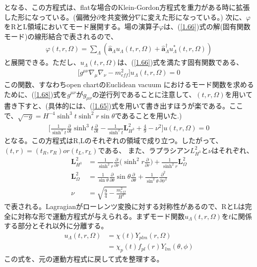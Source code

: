 となる、この方程式は、flatな場合のKlein-Gordon方程式を重力がある時に拡張した形になっている。(偏微分$\partial$を共変微分$\nabla$に変えた形になっている。)
次に、$\varphi$をRとL領域においてモード展開する。場の演算子$\varphi$は、(\ref{1.66})式の解(固有関数モード)の線形結合で表されるので、
\begin{align}
  \varphi(t,r,\Omega)=\sum_{\Lambda}(\hat{\bm{a}}_{\Lambda}u_{\Lambda}(t,r,\Omega)+\hat{\bm{a}}^{\dagger}_{\Lambda}u^{*}_{\Lambda}(t,r,\Omega))
\end{align}
と展開できる。ただし、$u_{\Lambda}(t,r,\Omega)$は、(\ref{1.66})式を満たす固有関数である、
\begin{align}
  \label{1.68}
\biggl[g^{\mu\nu}\nabla_{\mu}\nabla_{\nu}-m_{eff}^2\biggr]u_{\Lambda}(t,r,\Omega)=0
\end{align}
この関数、すなわちopen chartのEuclidean vacuum におけるモード関数を求めるために、(\ref{1.68})式を$g^{\mu\nu}$が$g_{\mu\nu}$の逆行列であることに注意して、$(t,r,\Omega)$を用いて書き下すと、(具体的には、(\ref{1.65})式を用いて書き出すほうが楽である。ここで、$\sqrt{-g}=H^{-4}\sinh^3t\sinh^2r\sin\theta$であることを用いた.)
\begin{align}
  \biggl[\frac{1}{\sinh^3t}\frac{\partial}{\partial t}\sinh^3t\frac{\partial}{\partial t}-\frac{1}{\sinh^2t}\bm{L}^2_{H^3}+\frac{4}{9}-\nu^2\biggr]u(t,r,\Omega)=0
\end{align}
となる。この方程式はR,Lのそれぞれの領域で成り立つ。したがって、$(t,r)=(t_{R},r_{R}) or (t_{L},r_{L})$である、
また、ラプラシアン$L_{H^3}^2$と$\nu$はそれぞれ、
\begin{align}
  \bm{L}_{H^3}^2&=\frac{1}{\sinh^2r}\frac{\partial}{\partial r}\biggl(\sinh^2r\frac{\partial}{\partial r}\biggr)+\frac{1}{\sinh^2r}\bm{L}_{\Omega}^2 \\
  \bm{L}_{\Omega}^2&=\frac{1}{\sin\theta}\frac{\partial}{\partial \theta}\sin{\theta}\frac{\partial}{\partial \theta}+\frac{1}{\sin^2{\theta}}
  \frac{\partial^2}{\partial \phi^2} \\
  \nu&=\sqrt{\frac{9}{4}-\frac{m^2_{eff}}{H^{2}}}
\end{align}
で表される。Lagragianがローレンツ変換に対する対称性があるので、RとLは完全に対称な形で運動方程式が与えられる。まずモード関数$u_{\Lambda}(t,r,\Omega)$を$t$に関係する部分とそれ以外に分離する。
\begin{align}
  u_{\Lambda}(t,r,\Omega)&=\chi(t)Y_{plm}(r,\Omega)\\
  &=\chi_p(t)f_{pl}(r)Y_{lm}(\theta,\phi)
 \end{align}
 この式を、元の運動方程式に戻して式を整理する。
